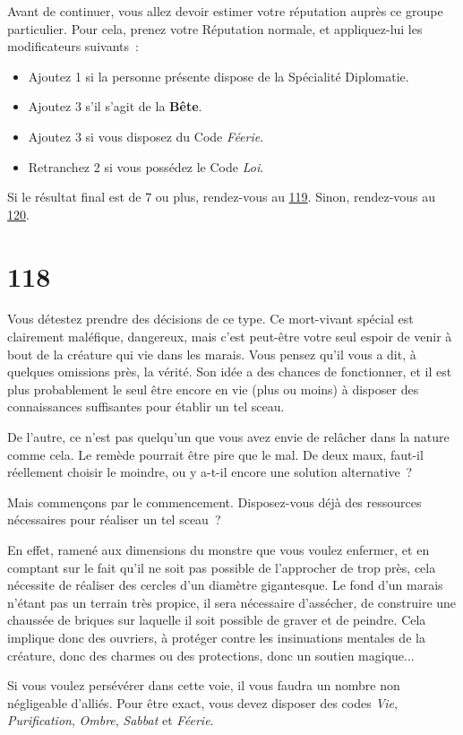 \documentclass{report}
\newcommand{\gsection}[1]{
    \section{#1}
    \label{section-#1}
}
\newcommand{\glink}[1]{\hyperref[section-#1]{#1}}
\newcommand{\hero}[1]{\textbf{#1}}
\begin{document}
Avant de continuer, vous allez devoir estimer votre réputation auprès ce groupe particulier. Pour cela, prenez votre Réputation normale, et appliquez-lui les modificateurs suivants :
\begin{itemize}
\item Ajoutez 1 si la personne présente dispose de la Spécialité Diplomatie.
\item Ajoutez 3 s'il s'agit de la \hero{Bête}.
\item Ajoutez 3 si vous disposez du Code \emph{Féerie}.
\item Retranchez 2 si vous possédez le Code \emph{Loi}.
\end{itemize}

Si le résultat final est de 7 ou plus, rendez-vous au \glink{119}. Sinon, rendez-vous au \glink{120}.

\gsection{118}

Vous détestez prendre des décisions de ce type. Ce mort-vivant spécial est clairement maléfique, dangereux, mais c'est peut-être votre seul espoir de venir à bout de la créature qui vie dans les marais. Vous pensez qu'il vous a dit, à quelques omissions près, la vérité. Son idée a des chances de fonctionner, et il est plus probablement le seul être encore en vie (plus ou moins) à disposer des connaissances suffisantes pour établir un tel sceau.

De l'autre, ce n'est pas quelqu'un que vous avez envie de relâcher dans la nature comme cela. Le remède pourrait être pire que le mal. De deux maux, faut-il réellement choisir le moindre, ou y a-t-il encore une solution alternative ?

Mais commençons par le commencement. Disposez-vous déjà des ressources nécessaires pour réaliser un tel sceau ?

En effet, ramené aux dimensions du monstre que vous voulez enfermer, et en comptant sur le fait qu'il ne soit pas possible de l'approcher de trop près, cela nécessite de réaliser des cercles d'un diamètre gigantesque. Le fond d'un marais n'étant pas un terrain très propice, il sera nécessaire d'assécher, de construire une chaussée de briques sur laquelle il soit possible de graver et de peindre. Cela implique donc des ouvriers, à protéger contre les insinuations mentales de la créature, donc des charmes ou des protections, donc un soutien magique...

Si vous voulez persévérer dans cette voie, il vous faudra un nombre non négligeable d'alliés. Pour être exact, vous devez disposer des codes \emph{Vie}, \emph{Purification}, \emph{Ombre}, \emph{Sabbat} et \emph{Féerie}.
\end{document}
